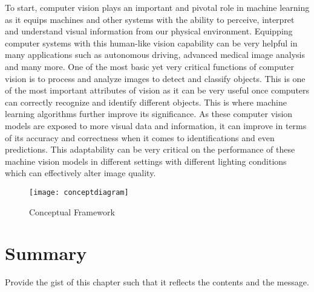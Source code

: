 

To start, computer vision plays an important and pivotal role in machine learning as it equips machines and other systems with the ability to perceive, interpret and understand visual information from our physical environment. Equipping computer systems with this human-like vision capability can be very helpful in many applications such as autonomous driving, advanced medical image analysis and many more. One of the most basic yet very critical functions of computer vision is to process and analyze images to detect and classify objects. This is one of the most important attributes of vision as it can be very useful once computers can correctly recognize and identify different objects. This is where machine learning algorithms further improve its significance. As these computer vision models are exposed to more visual data and information, it can improve in terms of its accuracy and correctness when it comes to identifications and even predictions. This adaptability can be very critical on the performance of these machine vision models in different settings with different lighting conditions which can effectively alter image quality.  

\begin{figure}[!htbp]
	\centering
		\texttt{[image: conceptdiagram]}
	\caption{Conceptual Framework }
	\label{fig:conceptdiagram}
\end{figure}

\section{Summary}

Provide the gist of this chapter such that it reflects the contents and the message.